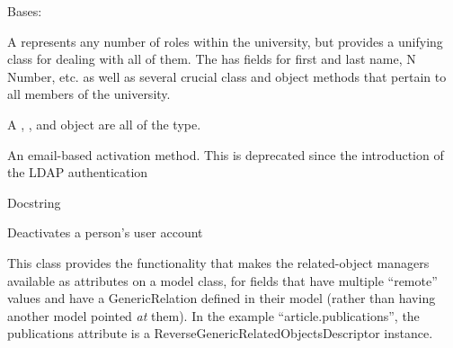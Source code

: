 \documentclass[letterpaper,10pt,english]{sphinxmanual}
\begin{document}

\begin{fulllineitems}
\label{generated/apps.profiles.models:apps.profiles.models.Person}
Bases: {\hyperref[generated/apps.profiles.models:apps.profiles.models.BaseModel]{}}

A  represents any number of roles within the university, but
provides a unifying class for dealing with all of them.  The 
has fields for first and last name, N Number, etc. as well as several
crucial class and object methods that pertain to all members of the
university.

A , , and  object are all of 
the  type.


\begin{fulllineitems}
\label{generated/apps.profiles.models:apps.profiles.models.Person.activate}
An email-based activation method.  This is deprecated since the 
introduction of the LDAP authentication

\end{fulllineitems}



\begin{fulllineitems}
\label{generated/apps.profiles.models:apps.profiles.models.Person.cv_text}
Docstring

\end{fulllineitems}



\begin{fulllineitems}
\label{generated/apps.profiles.models:apps.profiles.models.Person.deactivate}
Deactivates a person's user account

\end{fulllineitems}



\begin{fulllineitems}
\label{generated/apps.profiles.models:apps.profiles.models.Person.group_perms_set}
This class provides the functionality that makes the related-object
managers available as attributes on a model class, for fields that have
multiple ``remote'' values and have a GenericRelation defined in their model
(rather than having another model pointed \emph{at} them). In the example
``article.publications'', the publications attribute is a
ReverseGenericRelatedObjectsDescriptor instance.


\end{fulllineitems}
\end{fulllineitems}
\end{document}
